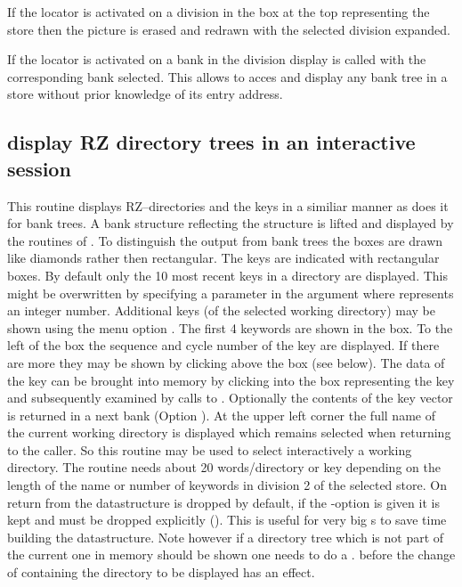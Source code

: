 If the locator is activated on a division in the box at the top
representing the store then  the picture is erased and redrawn
with the selected division expanded.
 
If the locator is activated on a bank in the division display
 is called with the corresponding bank selected.
This allows to acces and display any bank tree in a store
without prior knowledge of its entry address.
 
\finalnewpage
 
\subsection[{\tt DZDIRZ} display RZ directory trees in an interactive session]%
           { display RZ directory trees in an interactive session}
 
This routine displays RZ--directories and the keys in a similiar manner as
 does it for bank trees. 
A bank structure reflecting the \RZfile{}
structure is lifted and displayed by  the routines of .
To distinguish the output from bank trees the boxes are
drawn like diamonds rather then rectangular. 
The keys are indicated with rectangular boxes. 
By default only the 10 most recent keys in a directory are displayed. 
This might be overwritten by specifying a parameter 
in the  argument where  represents an integer number.
Additional keys (of the selected working directory) 
may be shown using the menu option .
The first 4 keywords are shown in the box. 
To the left of the box the sequence
and cycle number of the key are displayed.
If there are more they may be shown by clicking above the box (see below).
The data of the key can be brought into memory by clicking into the
box representing the key and subsequently examined by calls to .
Optionally the contents of the key vector is returned in a next bank (Option ).
At the upper left corner the full name of the current working directory
is displayed which remains selected when returning to the caller.
So this routine may be used to select interactively a working directory.
The routine needs about 20 words/directory or key depending on
the length of the name or number of keywords in division 2 of the
selected store. 
On return from  the datastructure is dropped
by default, if the -option is given it is kept and must be dropped
explicitly (). 
This is useful for very big \RZfile s to save time building the datastructure. 
Note however if a directory tree which is
not part of the current one in memory should be shown
one needs to do a .
before the change of  containing the directory
to be displayed has an effect.
 
